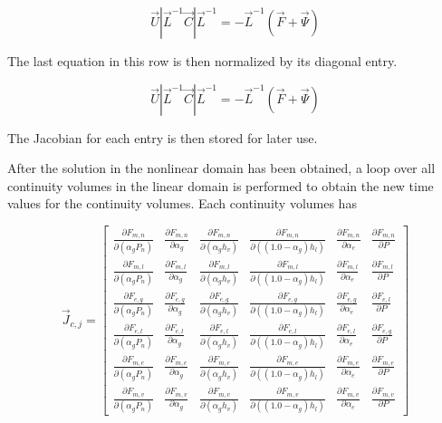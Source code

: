 \begin{equation}
\vec{U}|\vec{L}^{-1}\vec{C}|\vec{L}^{-1} = -\vec{L}^{-1}(\vec{F} + \vec{\Psi})
\end{equation}

The last equation in this row is then normalized by its diagonal entry.

\begin{equation}
\vec{U}|\vec{L}^{-1}\vec{C}|\vec{L}^{-1} = -\vec{L}^{-1}(\vec{F} + \vec{\Psi})
\end{equation}

The Jacobian for each entry is then stored for later use.


After the solution in the nonlinear domain has been obtained, a loop over all continuity volumes in the linear domain is performed to obtain the new time values for the continuity volumes.
Each continuity volumes has 

\begin{equation}
\label{eqn:jacobianWithFluxTerms}
\vec{J}_{c,j} = 
\begin{bmatrix}
\frac{\partial F_{m,n}}{\partial (\alpha_g P_{n})} & \frac{\partial F_{m,n}}{\partial \alpha_g } & \frac{\partial F_{m,n}}{\partial (\alpha_g h_v)} & \frac{\partial F_{m,n}}{\partial ((1.0 - \alpha_g) h_l) } & \frac{\partial F_{m,n}}{\partial \alpha_e } & \frac{\partial F_{m,n}}{\partial P } \\
\frac{\partial F_{m,l}}{\partial (\alpha_g P_{n})} & \frac{\partial F_{m,l}}{\partial \alpha_g } & \frac{\partial F_{m,l}}{\partial (\alpha_g h_v)} & \frac{\partial F_{m,l}}{\partial ((1.0 - \alpha_g) h_l)} &\frac{\partial F_{m,l}}{\partial \alpha_e } & \frac{\partial F_{m,l}}{\partial P } \\
\frac{\partial F_{e,g}}{\partial (\alpha_g P_{n})} & \frac{\partial F_{e,g}}{\partial \alpha_g } & \frac{\partial F_{e,g}}{\partial (\alpha_g h_v)} & \frac{\partial F_{e,g}}{\partial ((1.0 - \alpha_g) h_l)} &\frac{\partial F_{e,g}}{\partial \alpha_e } & \frac{\partial F_{e,l}}{\partial P } \\
\frac{\partial F_{e,l}}{\partial (\alpha_g P_{n})} & \frac{\partial F_{e,l}}{\partial \alpha_g } & \frac{\partial F_{e,l}}{\partial (\alpha_g h_v)} & \frac{\partial F_{e,l}}{\partial ((1.0 - \alpha_g) h_l)} &\frac{\partial F_{e,l}}{\partial \alpha_e } & \frac{\partial F_{e,g}}{\partial P } \\
\frac{\partial F_{m,e}}{\partial (\alpha_g P_{n})} & \frac{\partial F_{m,e}}{\partial \alpha_g } & \frac{\partial F_{m,e}}{\partial (\alpha_g h_v)} & \frac{\partial F_{m,e}}{\partial ((1.0 - \alpha_g) h_l)} &\frac{\partial F_{m,e}}{\partial \alpha_e } & \frac{\partial F_{m,e}}{\partial P } \\
\frac{\partial F_{m,v}}{\partial (\alpha_g P_{n})} & \frac{\partial F_{m,v}}{\partial \alpha_g } & \frac{\partial F_{m,v}}{\partial (\alpha_g h_v)} & \frac{\partial F_{m,v}}{\partial ((1.0 - \alpha_g) h_l)} & \frac{\partial F_{m,v}}{\partial \alpha_e } & \frac{\partial F_{m,v}}{\partial P }
\end{bmatrix}
\end{equation}
 
